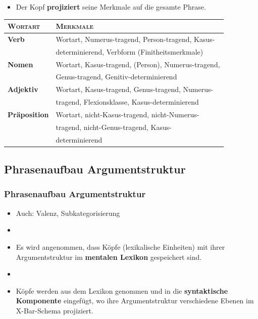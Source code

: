 \begin{frame}

\begin{itemize}
	\item Der Kopf \textbf{projiziert} seine Merkmale auf die gesamte Phrase. 
\end{itemize}

\begin{tabular}{ll}
\textsc{Wortart} & \textsc{Merkmale}\\
\hline
\textbf{Verb}		& Wortart, Numerus-tragend, Person-tragend, Kasus-\\
					& determinierend, Verbform (Finitheitsmerkmale) \\
\hline
\textbf{Nomen}		& Wortart, Kasus-tragend, (Person), Numerus-tragend,\\
					& Genus-tragend, Genitiv-determinierend\\
\hline
\textbf{Adjektiv}	& Wortart, Kasus-tragend, Genus-tragend, Numerus-\\ 
					& tragend, Flexionsklasse, Kasus-determinierend\\
\hline
\textbf{Präposition}& Wortart, nicht-Kasus-tragend, nicht-Numerus-\\
					& tragend, nicht-Genus-tragend, Kasus-\\
					& determinierend\\					
\end{tabular}
\end{frame}


\subsection{Phrasenaufbau \ras Argumentstruktur}

\begin{frame}
\frametitle{Phrasenaufbau \ras Argumentstruktur}

\begin{itemize}
	\item Auch: Valenz, Subkategorisierung
	\item[]
	\item Es wird angenommen, dass Köpfe (lexikalische Einheiten) \ua mit ihrer Argumentstruktur im \textbf{mentalen Lexikon} gespeichert sind.
	\item[]
	\item Köpfe werden aus dem Lexikon genommen und in die \textbf{syntaktische Komponente} eingefügt, wo ihre Argumentstruktur verschiedene Ebenen im X-Bar-Schema projiziert.
\end{itemize}

\end{frame}


